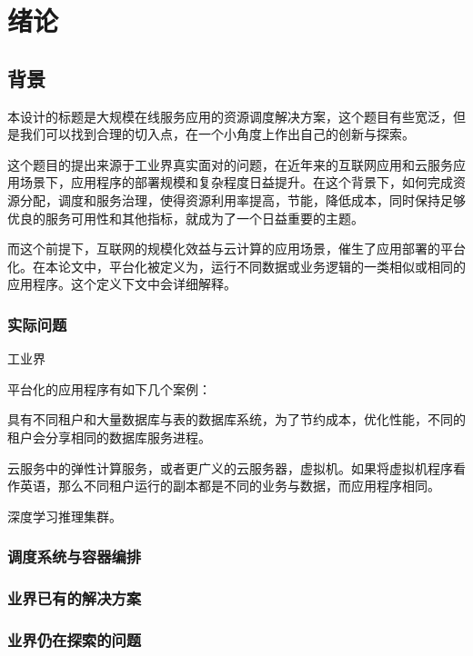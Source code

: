
\section{绪论}

\subsection{背景}

本设计的标题是大规模在线服务应用的资源调度解决方案，这个题目有些宽泛，但是我们可以找到合理的切入点，在一个小角度上作出自己的创新与探索。

这个题目的提出来源于工业界真实面对的问题，在近年来的互联网应用和云服务应用场景下，应用程序的部署规模和复杂程度日益提升。在这个背景下，如何完成资源分配，调度和服务治理，使得资源利用率提高，节能，降低成本，同时保持足够优良的服务可用性和其他指标，就成为了一个日益重要的主题。

而这个前提下，互联网的规模化效益与云计算的应用场景，催生了应用部署的平台化。在本论文中，平台化被定义为，运行不同数据或业务逻辑的一类相似或相同的应用程序。这个定义下文中会详细解释。

\subsubsection{实际问题}

工业界

平台化的应用程序有如下几个案例：

具有不同租户和大量数据库与表的数据库系统，为了节约成本，优化性能，不同的租户会分享相同的数据库服务进程。

云服务中的弹性计算服务，或者更广义的云服务器，虚拟机。如果将虚拟机程序看作英语，那么不同租户运行的副本都是不同的业务与数据，而应用程序相同。

深度学习推理集群。

\subsubsection{调度系统与容器编排}

\subsubsection{业界已有的解决方案}

\subsubsection{业界仍在探索的问题}
